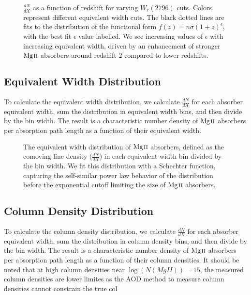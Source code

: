 \documentclass[iop,apj,numberedappendix,appendixfloats,twocolappendix]{emulateapj}
\begin{document}
\begin{figure}[bth]
\caption{$\frac{dN}{dX}$ as a function of redshift for varying $W_r(2796)$ cuts. Colors represent different equivalent width cuts. The black dotted lines are fits to the distribution of the functional form $f(z) = n\sigma (1 + z)^{\epsilon}$, with the best fit $\epsilon$ value labelled. We see increasing values of $\epsilon$ with increasing equivalent width, driven by an enhancement of stronger ${\hbox{{\rm Mg}\kern 0.1em{\sc ii}}}$ absorbers around redshift 2 compared to lower redshifts.}
\label{fig:dndx_cuts}
\end{figure}

\subsection{Equivalent Width Distribution}
\label{sec:ewdistro}

To calculate the equivalent width distribution, we calculate $\frac{dN}{dX}$ for each absorber equivalent width, sum the distribution in equivalent width bins, and then divide by the bin width. The result is a characteristic number density of ${\hbox{{\rm Mg}\kern 0.1em{\sc ii}}}$ absorbers per absorption path length as a function of their equivalent width.

\begin{figure*}[bth]
\caption{The equivalent width distribution of ${\hbox{{\rm Mg}\kern 0.1em{\sc ii}}}$ absorbers, defined as the comoving line density ($\frac{dN}{dX}$) in each equivalent width bin divided by the bin width. We fit this distribution with a Schechter function, capturing the self-similar power law behavior of the distribution before the exponential cutoff limiting the size of ${\hbox{{\rm Mg}\kern 0.1em{\sc ii}}}$ absorbers.}
\label{fig:dndx_cuts}
\end{figure*}

\subsection{Column Density Distribution}
\label{sec:logndistro}

To calculate the column density distribution, we calculate $\frac{dN}{dX}$ for each absorber equivalent width, sum the distribution in column density bins, and then divide by the bin width. The result is a characteristic number density of ${\hbox{{\rm Mg}\kern 0.1em{\sc ii}}}$ absorbers per absorption path length as a function of their column densities. It should be noted that at high column densities near $\log (N(MgII)) = 15$, the measured column densities are lower limites as the AOD method to measure column densities cannot constrain the true col
\end{document}
